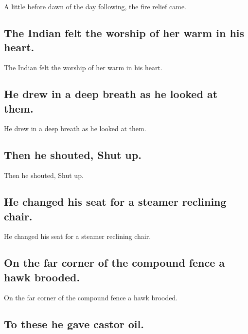 \documentclass[]{article}
\begin{document}
A little before dawn of the day following, the fire relief came.

\hypertarget{the-indian-felt-the-worship-of-her-warm-in-his-heart.}{%
\subsection{The Indian felt the worship of her warm in his
heart.}\label{the-indian-felt-the-worship-of-her-warm-in-his-heart.}}

The Indian felt the worship of her warm in his heart.

\hypertarget{he-drew-in-a-deep-breath-as-he-looked-at-them.}{%
\subsection{He drew in a deep breath as he looked at
them.}\label{he-drew-in-a-deep-breath-as-he-looked-at-them.}}

He drew in a deep breath as he looked at them.

\hypertarget{then-he-shouted-shut-up.}{%
\subsection{Then he shouted, Shut up.}\label{then-he-shouted-shut-up.}}

Then he shouted, Shut up.

\hypertarget{he-changed-his-seat-for-a-steamer-reclining-chair.}{%
\subsection{He changed his seat for a steamer reclining
chair.}\label{he-changed-his-seat-for-a-steamer-reclining-chair.}}

He changed his seat for a steamer reclining chair.

\hypertarget{on-the-far-corner-of-the-compound-fence-a-hawk-brooded.}{%
\subsection{On the far corner of the compound fence a hawk
brooded.}\label{on-the-far-corner-of-the-compound-fence-a-hawk-brooded.}}

On the far corner of the compound fence a hawk brooded.

\hypertarget{to-these-he-gave-castor-oil.}{%
\subsection{To these he gave castor
oil.}\label{to-these-he-gave-castor-oil.}}
\end{document}
